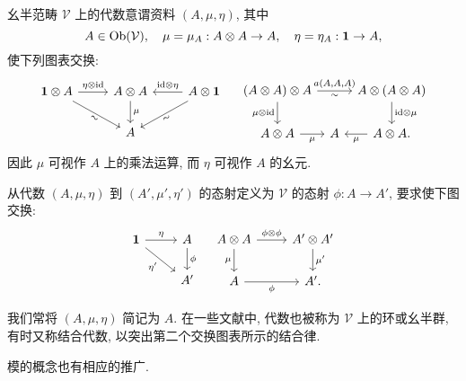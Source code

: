 \begin{definition}[代数]\label{def:algebra-monoidal}
	幺半范畴 $\mathcal{V}$ 上的代数意谓资料 $(A, \mu, \eta)$, 其中
	\[ A \in \operatorname{Ob}(\mathcal{V}), \quad \mu = \mu_A: A \otimes A \to A, \quad \eta = \eta_A: \bm{1} \to A, \]
	使下列图表交换:
	\begin{equation*}\begin{gathered}
		\begin{tikzcd}
			\munit \otimes A \arrow[r, "{\eta \otimes \identity}"] \arrow[rd, "\sim"' sloped] & A \otimes A \arrow[d, "\mu"] & A \otimes \munit \arrow[l, "{\identity \otimes \eta}"'] \arrow[ld, "\sim"' sloped] \\
			& A &
		\end{tikzcd} \quad
		\begin{tikzcd}[column sep=tiny]
			(A \otimes A) \otimes A \arrow[rr, "{a(A, A, A)}", "\sim"'] \arrow[d, "{\mu \otimes \identity}"'] & & A \otimes (A \otimes A) \arrow[d, "{\identity \otimes \mu}"] \\
			A \otimes A \arrow[r, "\mu"'] & A & A \otimes A \arrow[l, "\mu"] .
		\end{tikzcd}
	\end{gathered}\end{equation*}
	因此 $\mu$ 可视作 $A$ 上的乘法运算, 而 $\eta$ 可视作 $A$ 的幺元.
	
	从代数 $(A, \mu, \eta)$ 到 $(A', \mu', \eta')$ 的态射定义为 $\mathcal{V}$ 的态射 $\phi: A \to A'$, 要求使下图交换:
	\[\begin{tikzcd}
		\munit \arrow[r, "\eta"] \arrow[rd, "{\eta'}"'] & A \arrow[d, "\phi"] \\
		& A'
	\end{tikzcd} \quad \begin{tikzcd}
		A \otimes A \arrow[d, "\mu"'] \arrow[r, "{\phi \otimes \phi}"] & A' \otimes A' \arrow[d, "{\mu'}"] \\
		A \arrow[r, "\phi"'] & A' .
	\end{tikzcd}\]
\end{definition}

我们常将 $(A, \mu, \eta)$ 简记为 $A$. 在一些文献中, 代数也被称为 $\mathcal{V}$ 上的环或幺半群, 有时又称结合代数, 以突出第二个交换图表所示的结合律.

模的概念也有相应的推广.

